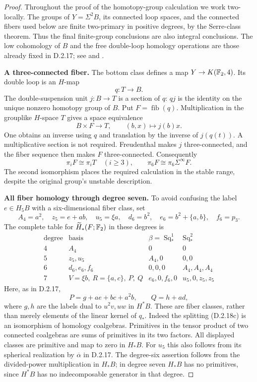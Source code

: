 \begin{proof}
Throughout the proof of the homotopy-group calculation we work
two-locally. The groups of $Y=\Sigma^2B$, its connected loop spaces,
and the connected fibers used below are finite two-primary in
positive degrees, by the Serre-class theorem. Thus the final
finite-group conclusions are also integral conclusions. The
low cohomology of $B$ and the free double-loop homology operations
are those already fixed in D.2.17; see
\cite[\S2, nos.~8--9]{I_Serre1953} and
\cite[Chapter~III, Theorems~1.2--1.4 and 3.1--3.2]{I_CohenLadaMay1976}.

\medskip\noindent
\textbf{A three-connected fiber.}
The bottom class defines a map $Y\to K(\mathbb F_2,4)$. Its double
loop is an $H$-map
\[
 q:T\longrightarrow B.
\]
The double-suspension unit $j:B\to T$ is a section of $q$:
$qj$ is the identity on the unique nonzero homotopy group of $B$.
Put $F=\operatorname{fib}(q)$. Multiplication in the grouplike
$H$-space $T$ gives a space equivalence
\[
 B\times F\longrightarrow T,\qquad (b,x)\longmapsto j(b)x.
 \tag{D.2.18c}
\]
One obtains an inverse using $q$ and translation by the inverse
of $j(q(t))$. A multiplicative section is not required.
Freudenthal makes $j$ three-connected, and the fiber sequence
then makes $F$ three-connected. Consequently
\[
 \pi_iF\cong\pi_iT\quad(i\ge3),\qquad
 \pi_6F\cong\pi_6\Sigma^\infty F.
 \tag{D.2.18d}
\]
The second isomorphism places the required calculation in the
stable range, despite the original group's unstable description.

\medskip\noindent
\textbf{All fiber homology through degree seven.}
To avoid confusing the label $e\in H_5B$ with a six-dimensional
fiber class, set
\[
 A_4=a^2,\quad z_5=e+ab,\quad u_5=\xi a,\quad
 d_6=b^2,\quad e_6=b^2+\{a,b\},\quad f_6=p_3.
\]
The complete table for $\widetilde H_*(F;\mathbb F_2)$ in these degrees is
\[
\begin{array}{c|c|c|c}
 \text{degree}&\text{basis}&\beta=\operatorname{Sq}_*^1
                    &\operatorname{Sq}_*^2\\ \hline
 4&A_4&0&0\\
 5&z_5,u_5&A_4,0&0,0\\
 6&d_6,e_6,f_6&0,0,0&A_4,A_4,A_4\\
 7&V=\xi b,\ R=\{a,c\},\ P,\ Q&e_6,0,f_6,0&u_5,0,z_5,z_5
\end{array}
 \tag{D.2.18e}
\]
Here, as in D.2.17,
\[
 P=g+ae+bc+a^2b,\qquad Q=h+ad,
\]
where $g,h$ are the labels dual to $u^2v,uw$ in $H^*B$.
These are fiber classes, rather than merely elements of the
linear kernel of $q_*$. Indeed the splitting
\textup{(D.2.18c)} is an isomorphism of homology coalgebras.
Primitives in the tensor product of two connected coalgebras
are sums of primitives in its two factors. All displayed
classes are primitive and map to zero in $H_*B$.
For $u_5$ this also follows from its spherical realization by
$\overline\alpha$ in D.2.17. The degree-six assertion follows
from the divided-power multiplication in $H_*B$; in degree
seven $H_*B$ has no primitives, since $H^*B$ has no
indecomposable generator in that degree.


\end{proof}
